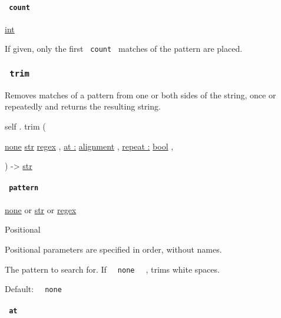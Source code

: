 \paragraph{\texorpdfstring{\texttt{\ count\ }}{ count }}\label{definitions-replace-count}

\href{/docs/reference/foundations/int/}{int}

If given, only the first \texttt{\ count\ } matches of the pattern are
placed.

\subsubsection{\texorpdfstring{\texttt{\ trim\ }}{ trim }}\label{definitions-trim}

Removes matches of a pattern from one or both sides of the string, once
or repeatedly and returns the resulting string.

self { . } { trim } (

{ \href{/docs/reference/foundations/none/}{none}
\href{/docs/reference/foundations/str/}{str}
\href{/docs/reference/foundations/regex/}{regex} , } {
\hyperref[definitions-trim-parameters-at]{at :}
\href{/docs/reference/layout/alignment/}{alignment} , } {
\hyperref[definitions-trim-parameters-repeat]{repeat :}
\href{/docs/reference/foundations/bool/}{bool} , }

) -\textgreater{} \href{/docs/reference/foundations/str/}{str}

\paragraph{\texorpdfstring{\texttt{\ pattern\ }}{ pattern }}\label{definitions-trim-pattern}

\href{/docs/reference/foundations/none/}{none} {or}
\href{/docs/reference/foundations/str/}{str} {or}
\href{/docs/reference/foundations/regex/}{regex}

{{ Positional }}

\label{definitions-trim-pattern-positional-tooltip}
Positional parameters are specified in order, without names.

The pattern to search for. If \texttt{\ }{\texttt{\ none\ }}\texttt{\ }
, trims white spaces.

Default: \texttt{\ }{\texttt{\ none\ }}\texttt{\ }

\paragraph{\texorpdfstring{\texttt{\ at\ }}{ at }}\label{definitions-trim-at}

